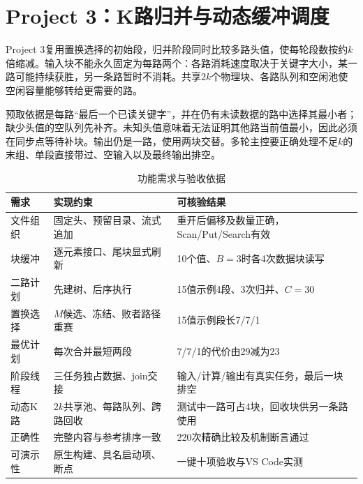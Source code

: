 \section{Project 3：K路归并与动态缓冲调度}
Project 3复用置换选择的初始段，归并阶段同时比较多路头值，使每轮段数按约$k$倍缩减。输入块不能永久固定为每路两个：各路消耗速度取决于关键字大小，某一路可能持续获胜，另一条路暂时不消耗。共享$2k$个物理块、各路队列和空闲池使空闲容量能够转给更需要的路。

预取依据是每路“最后一个已读关键字”，并在仍有未读数据的路中选择其最小者；缺少头值的空队列先补齐。未知头值意味着无法证明其他路当前值最小，因此必须在同步点等待补块。输出仍是一路，使用两块交替。多轮主控要正确处理不足$k$的末组、单段直接带过、空输入以及最终输出排空。

\begin{table}[htbp]\centering\caption{功能需求与验收依据}\label{tab:requirements}
\small\begin{tabularx}{\linewidth}{lYY}\toprule
需求 & 实现约束 & 可核验结果\\\midrule
文件组织 & 固定头、预留目录、流式追加 & 重开后偏移及数量正确，Scan/Put/Search有效\\
块缓冲 & 逐元素接口、尾块显式刷新 & 10个值、$B=3$时各4次数据块读写\\
二路计划 & 先建树、后序执行 & 15值示例4段、3次归并、$C=30$\\
置换选择 & $M$候选、冻结、败者路径重赛 & 15值示例段长7/7/1\\
最优计划 & 每次合并最短两段 & 7/7/1的代价由29减为23\\
阶段线程 & 三任务独占数据、join交接 & 输入/计算/输出有真实任务，最后一块排空\\
动态K路 & $2k$共享池、每路队列、跨路回收 & 测试中一路可占4块，回收块供另一条路使用\\
正确性 & 完整内容与参考排序一致 & 220次精确比较及机制断言通过\\
可演示性 & 原生构建、具名启动项、断点 & 一键十项验收与VS Code实测\\\bottomrule
\end{tabularx}\end{table}
